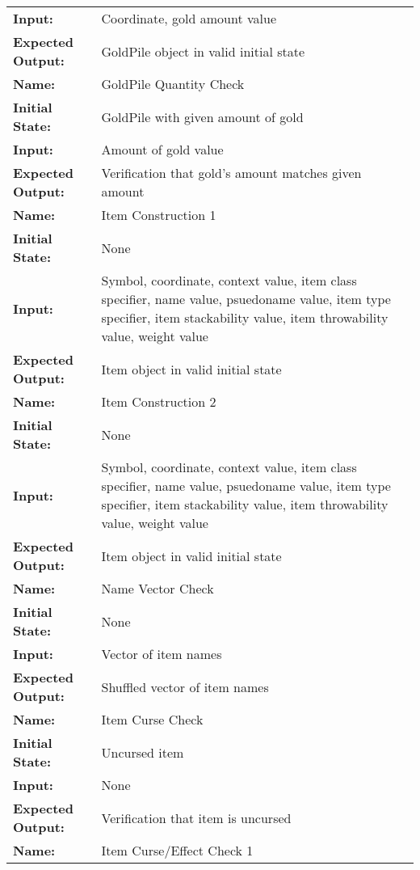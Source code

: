 \documentclass[12pt, titlepage]{article}
\begin{document}
\begin{center}
\begin{longtable}{ l | p{10cm} }
				\textbf{Input:} & Coordinate, gold amount value\\
				\textbf{Expected Output:} & GoldPile object in valid initial state\\[0.6em]
				\hline
				\rule{0pt}{1.5em}\textbf{Name:} & GoldPile Quantity Check\\
				\textbf{Initial State:} & GoldPile with given amount of gold\\
				\textbf{Input:} & Amount of gold value\\
				\textbf{Expected Output:} & Verification that gold's amount matches given amount\\[0.6em]
				\hline
				\rule{0pt}{1.5em}\textbf{Name:} & Item Construction 1\\
				\textbf{Initial State:} & None\\
				\textbf{Input:} & Symbol, coordinate, context value, item class specifier, name value, psuedoname value, item type specifier, item stackability value, item throwability value, weight value\\
				\textbf{Expected Output:} & Item object in valid initial state\\[0.6em]
				\rule{0pt}{1.5em}\textbf{Name:} & Item Construction 2\\
				\textbf{Initial State:} & None\\
				\textbf{Input:} & Symbol, coordinate, context value, item class specifier, name value, psuedoname value, item type specifier, item stackability value, item throwability value, weight value\\
				\textbf{Expected Output:} & Item object in valid initial state\\[0.6em]
				\hline
				\rule{0pt}{1.5em}\textbf{Name:} & Name Vector Check\\
				\textbf{Initial State:} & None\\
				\textbf{Input:} & Vector of item names\\
				\textbf{Expected Output:} & Shuffled vector of item names\\[0.6em]
				\hline
				\rule{0pt}{1.5em}\textbf{Name:} & Item Curse Check\\
				\textbf{Initial State:} & Uncursed item\\
				\textbf{Input:} & None\\
				\textbf{Expected Output:} & Verification that item is uncursed\\[0.6em]
				\hline
				\rule{0pt}{1.5em}\textbf{Name:} & Item Curse/Effect Check 1\\

\end{longtable}
\end{center}
\end{document}
